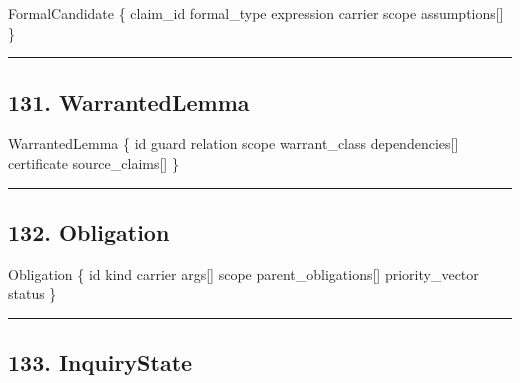 \documentclass[
]{article}
\newenvironment{Shaded}{}{}
\newcommand{\NormalTok}[1]{#1}
\begin{document}
\begin{Shaded}
\begin{Highlighting}[]
\NormalTok{FormalCandidate \{}
\NormalTok{    claim\_id}
\NormalTok{    formal\_type}
\NormalTok{    expression}
\NormalTok{    carrier}
\NormalTok{    scope}
\NormalTok{    assumptions[]}
\NormalTok{\}}
\end{Highlighting}
\end{Shaded}

\begin{center}\rule{0.5\linewidth}{0.5pt}\end{center}

\subsection{131. WarrantedLemma}\label{warrantedlemma}

\begin{Shaded}
\begin{Highlighting}[]
\NormalTok{WarrantedLemma \{}
\NormalTok{    id}
\NormalTok{    guard}
\NormalTok{    relation}
\NormalTok{    scope}
\NormalTok{    warrant\_class}
\NormalTok{    dependencies[]}
\NormalTok{    certificate}
\NormalTok{    source\_claims[]}
\NormalTok{\}}
\end{Highlighting}
\end{Shaded}

\begin{center}\rule{0.5\linewidth}{0.5pt}\end{center}

\subsection{132. Obligation}\label{obligation}

\begin{Shaded}
\begin{Highlighting}[]
\NormalTok{Obligation \{}
\NormalTok{    id}
\NormalTok{    kind}
\NormalTok{    carrier}
\NormalTok{    args[]}
\NormalTok{    scope}
\NormalTok{    parent\_obligations[]}
\NormalTok{    priority\_vector}
\NormalTok{    status}
\NormalTok{\}}
\end{Highlighting}
\end{Shaded}

\begin{center}\rule{0.5\linewidth}{0.5pt}\end{center}

\subsection{133. InquiryState}\label{inquirystate}
\end{document}
